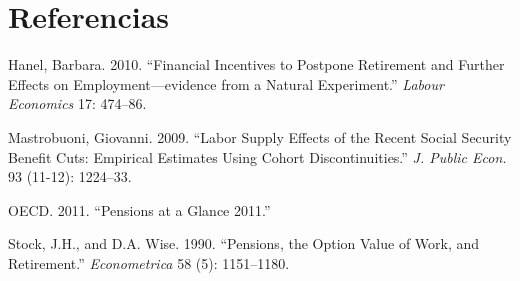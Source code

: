 \documentclass[]{article}
\begin{document}
\section*{Referencias}\label{referencias}

\hypertarget{refs}{}
\hypertarget{ref-hanel09}{}
Hanel, Barbara. 2010. ``Financial Incentives to Postpone Retirement and
Further Effects on Employment---evidence from a Natural Experiment.''
\emph{Labour Economics} 17: 474--86.

\hypertarget{ref-mastrobouni09}{}
Mastrobuoni, Giovanni. 2009. ``Labor Supply Effects of the Recent Social
Security Benefit Cuts: Empirical Estimates Using Cohort
Discontinuities.'' \emph{J. Public Econ.} 93 (11-12): 1224--33.

\hypertarget{ref-ocde11}{}
OECD. 2011. ``Pensions at a Glance 2011.''

\hypertarget{ref-stock90}{}
Stock, J.H., and D.A. Wise. 1990. ``Pensions, the Option Value of Work,
and Retirement.'' \emph{Econometrica} 58 (5): 1151--1180.
\end{document}
